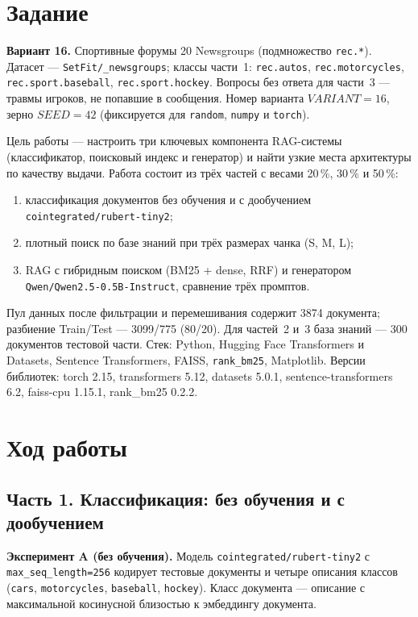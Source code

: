\documentclass[14pt,a4paper]{extarticle}
\begin{document}
\section{Задание}

\textbf{Вариант 16.} Спортивные форумы 20 Newsgroups (подмножество \texttt{rec.*}).
Датасет --- \texttt{SetFit/\_newsgroups}; классы части~1:
\texttt{rec.\allowbreak autos}, \texttt{rec.\allowbreak motorcycles},
\texttt{rec.sport.\allowbreak baseball}, \texttt{rec.sport.\allowbreak hockey}. Вопросы без ответа для части~3 --- травмы игроков,
не попавшие в сообщения. Номер варианта $VARIANT=16$, зерно
$SEED=42$ (фиксируется для \texttt{random}, \texttt{numpy} и \texttt{torch}).

Цель работы --- настроить три ключевых компонента RAG-системы (классификатор,
поисковый индекс и генератор) и найти узкие места архитектуры по качеству выдачи.
Работа состоит из трёх частей с весами 20\,\%, 30\,\% и 50\,\%:
\begin{enumerate}
    \item классификация документов без обучения и с дообучением
          \texttt{cointegrated/\allowbreak rubert-tiny2};
    \item плотный поиск по базе знаний при трёх размерах чанка (S, M, L);
    \item RAG с гибридным поиском (BM25 + dense, RRF) и генератором
          \texttt{Qwen/Qwen2.5-0.5B-Instruct}, сравнение трёх промптов.
\end{enumerate}

Пул данных после фильтрации и перемешивания содержит 3874 документа;
разбиение Train/Test --- 3099/775 (80/20). Для частей~2 и~3 база знаний ---
300 документов тестовой части. Стек: Python, Hugging Face Transformers и Datasets,
Sentence Transformers, FAISS, \texttt{rank\_bm25}, Matplotlib. Версии библиотек:
torch 2.15, transformers 5.12, datasets 5.0.1, sentence-transformers 6.2,
faiss-cpu 1.15.1, rank\_bm25 0.2.2.

\section{Ход работы}

\subsection{Часть 1. Классификация: без обучения и с дообучением}

\textbf{Эксперимент A (без обучения).} Модель \texttt{cointegrated/rubert-tiny2}
с \texttt{max\_seq\_length=256} кодирует тестовые документы и четыре описания
классов (\texttt{cars}, \texttt{motorcycles}, \texttt{baseball}, \texttt{hockey}).
Класс документа --- описание с максимальной косинусной близостью к эмбеддингу
документа.
\end{document}
